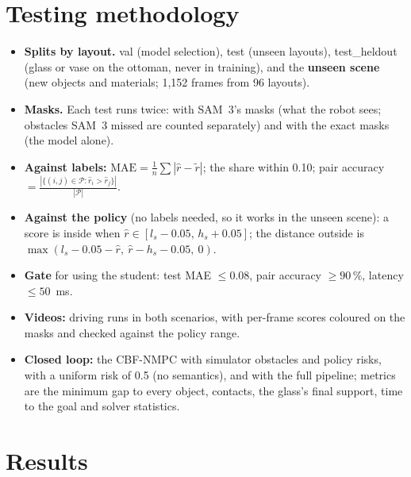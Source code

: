 \documentclass[10pt,a4paper]{article}
\begin{document}
\section{Testing methodology}

\begin{itemize}
\item \textbf{Splits by layout.} val (model selection), test (unseen layouts), test\_heldout (glass or vase on the ottoman, never in
training), and the \textbf{unseen scene} (new objects and materials; 1{,}152 frames from 96 layouts).
\item \textbf{Masks.} Each test runs twice: with SAM~3's masks (what the robot sees; obstacles SAM~3 missed are counted
separately) and with the exact masks (the model alone).
\item \textbf{Against labels:} $\mathrm{MAE}=\frac1n\sum|\hat r-\tilde r|$; the share within 0.10; pair accuracy
$=\frac{|\{(i,j)\in\mathcal P:\hat r_i>\hat r_j\}|}{|\mathcal P|}$.
\item \textbf{Against the policy} (no labels needed, so it works in the unseen scene): a score is inside when
$\hat r\in[l_s-0.05,\,h_s+0.05]$; the distance outside is $\max(l_s-0.05-\hat r,\ \hat r-h_s-0.05,\ 0)$.
\item \textbf{Gate} for using the student: test MAE $\leq0.08$, pair accuracy $\geq90\,\%$, latency $\leq50$~ms.
\item \textbf{Videos:} driving runs in both scenarios, with per-frame scores coloured on the masks and checked against the policy range.
\item \textbf{Closed loop:} the CBF-NMPC with simulator obstacles and policy risks, with a uniform risk of 0.5 (no semantics), and
with the full pipeline; metrics are the minimum gap to every object, contacts, the glass's final support, time to the goal and
solver statistics.
\end{itemize}

\section{Results}
\end{document}

